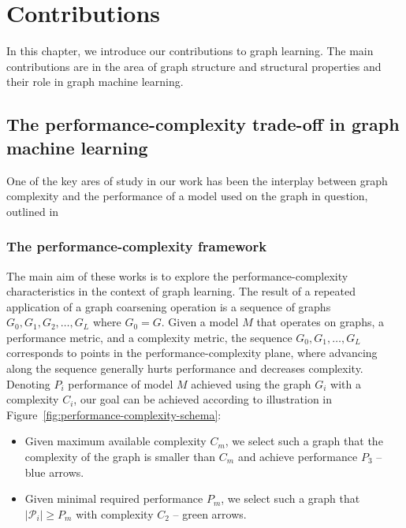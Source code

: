 \chapter{Contributions}
\label{chap:my-research}

In this chapter, we introduce our contributions to graph learning. The main contributions are in the area of graph structure and structural properties and their role in graph machine learning.


\section{The performance-complexity trade-off in graph machine learning}
\label{sec:performance-complexity}

One of the key ares of study in our work has been the interplay between graph complexity and the performance of a model used on the graph in question, outlined in \cite{prochazka_scalable_2022, dedic_balancing_2023, dedic_balancing_2024}

\subsection{The performance-complexity framework}

The main aim of these works is to explore the performance-complexity characteristics in the context of graph learning. The result of a repeated application of a graph coarsening operation is a sequence of graphs \( G_0, G_1, G_2, \dots, G_L \) where \( G_0 = G \).
Given a model \( M \) that operates on graphs, a performance metric, and a complexity metric, the sequence \( G_0, G_1, \dots, G_L \) corresponds to points in the performance-complexity plane, where advancing along the sequence generally hurts performance and decreases complexity. Denoting $P_i$ performance of model $M$ achieved using the graph $G_i$ with a complexity \( C_i \), our goal can be achieved according to illustration in Figure~\ref{fig:performance-complexity-schema}:
\begin{itemize}
	\item Given maximum available complexity $C_m$, we select such a graph that the complexity of the graph is smaller than $C_m$ and achieve performance $P_3$ -- blue arrows.
	\item Given minimal required performance $P_m$, we select such a graph that $|\mathcal{P}_i|\ge P_m$ with complexity $C_2$ -- green arrows.
\end{itemize}

